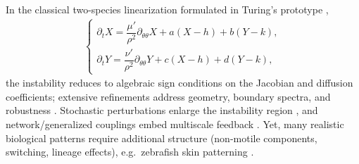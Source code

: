 \documentclass[pdflatex,sn-mathphys-ay]{sn-jnl}
\theoremstyle{thmstyleone}
\theoremstyle{definition}
\theoremstyle{remark}
\begin{document}
In the classical two-species linearization formulated in Turing's prototype \citep{turing_chemical_1952,cherniha_nonlinear_2017,kondo_reaction-diffusion_2010},
\begin{align}
\label{eq:intro_turing}
\begin{cases}
\partial_{t}X = \dfrac{\mu'}{\rho^2}\partial_{\theta\theta}X + a(X-h)+b(Y-k), \\[4pt]
\partial_{t}Y = \dfrac{\nu'}{\rho^2}\partial_{\theta\theta}Y + c(X-h)+d(Y-k),
\end{cases}
\end{align}
the instability reduces to algebraic sign conditions on the Jacobian and diffusion coefficients; 
extensive refinements address
geometry, boundary spectra, and robustness \citep{marcon_turing_2012,chen_non-linear_2019,maini_turings_2012,ninomiya_example_2024,gierer_theory_1972,kondo_reaction-diffusion_2010,mimura_diffusive_1978}.
Stochastic perturbations enlarge the instability region \citep{cao_stochastic_2014}, and network/generalized couplings embed multiscale feedback
\citep{regueira_lopez_de_garayo_network_2025}. Yet, many realistic biological patterns require additional structure (non-motile components, switching, lineage effects),
e.g.\ zebrafish skin patterning \citep{kondo_studies_2021,frohnhofer_iridophores_2013,mahalwar_local_2014}.
\end{document}
